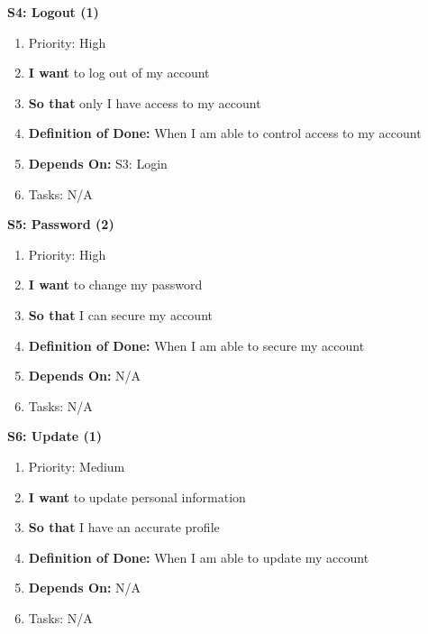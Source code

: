 \textbf{S4: Logout (1)}
\begin{enumerate}
    \item Priority: High
    \item \textbf{I want} to log out of my account
    \item \textbf{So that} only I have access to my account
    \item \textbf{Definition of Done:} When I am able to control access to my account
    \item \textbf{Depends On:} S3: Login
    \item Tasks: N/A
\end{enumerate}


\textbf{S5: Password (2)}
\begin{enumerate}
    \item Priority: High
    \item \textbf{I want} to change my password
    \item \textbf{So that} I can secure my account
    \item \textbf{Definition of Done:} When I am able to secure my account
    \item \textbf{Depends On:} N/A
    \item Tasks: N/A
\end{enumerate}


\textbf{S6: Update (1)}
\begin{enumerate}
    \item Priority: Medium
    \item \textbf{I want} to update personal information
    \item \textbf{So that} I have an accurate profile
    \item \textbf{Definition of Done:} When I am able to update my account
    \item \textbf{Depends On:} N/A
    \item Tasks: N/A
\end{enumerate}



